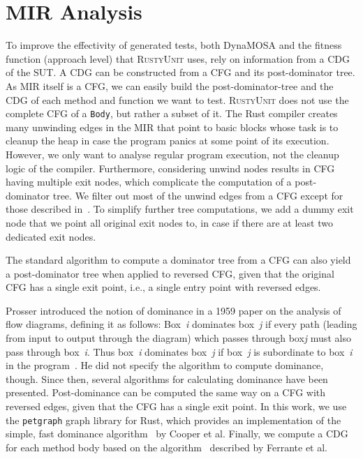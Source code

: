 \documentclass[paper=a4,%
  twoside,%
  BCOR4mm,%
  abstract=true,%
  toc=bibliography,%
  chapterprefix=true,%
  toc=bibliographynumbered,%
  open=right,%
  english,%
  pagesize=pdftex]{scrreprt}
\newcommand{\tech}{\textsc{RustyUnit}\xspace}
\newcommand{\mir}{\ac{MIR}\xspace}
\newcommand{\cfg}{\ac{CFG}\xspace}
\newcommand{\sut}{\ac{SUT}\xspace}
\begin{document}
\section{MIR Analysis}
To improve the effectivity of generated tests, both DynaMOSA and the fitness function (approach level) that \tech uses, rely on information from a \ac{CDG}~\cite{Ferrante1987} of the \sut. A \ac{CDG} can be constructed from a \cfg and its post-dominator tree. As \mir itself is a \cfg, we can easily build the post-dominator-tree and the \ac{CDG} of each method and function we want to test. \tech does not use the complete \cfg of a \texttt{Body}, but rather a subset of it. The Rust compiler creates many unwinding edges in the \mir that point to basic blocks whose task is to cleanup the heap in case the program panics at some point of its execution. However, we only want to analyse regular program execution, not the cleanup logic of the compiler. Furthermore, considering unwind nodes results in \cfg having multiple exit nodes, which complicate the computation of a post-dominator tree. We filter out most of the unwind edges from a \cfg except for those described in~. To simplify further tree computations, we add a dummy exit node that we point all original exit nodes to, in case if there are at least two dedicated exit nodes. 

The standard algorithm to compute a dominator tree from a \cfg can also yield a post-dominator tree when applied to reversed \cfg, given that the original \cfg has a single exit point, i.e., a single entry point with reversed edges.

Prosser introduced the notion of dominance in a 1959 paper on the analysis of flow diagrams, defining it as follows:
Box~\emph{i} dominates box~\emph{j} if every path (leading from input to output through the diagram) which passes through box\emph{j} must also pass through box~\emph{i}. Thus box~\emph{i} dominates box~\emph{j} if box~\emph{j} is subordinate to box~\emph{i} in the program~\cite{Prosser1959}. He did not specify the algorithm to compute dominance, though. Since then, several algorithms for calculating dominance have been presented. Post-dominance can be computed the same way on a \cfg with reversed edges, given that the \cfg has a single exit point. In this work, we use the \texttt{petgraph} graph library for Rust, which provides an implementation of the simple, fast dominance algorithm~\cite{Cooper2001} by Cooper et al. Finally, we compute a \ac{CDG} for each method body based on the algorithm~\cite{Ferrante1987} described by Ferrante et al.
\end{document}
